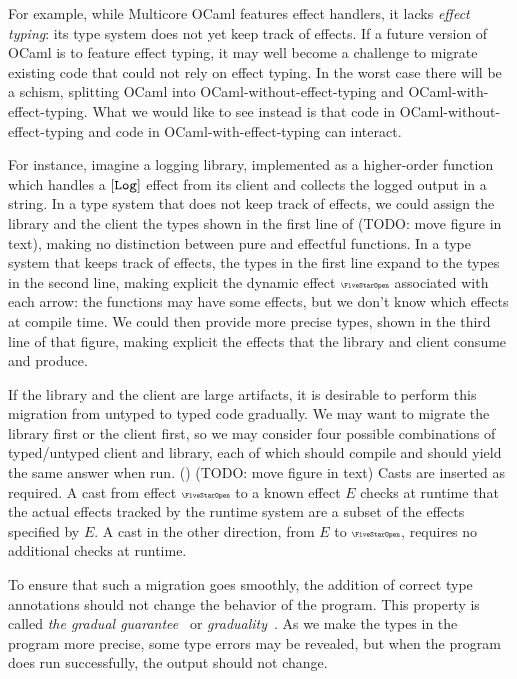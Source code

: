 For example,
while Multicore OCaml features effect handlers, it lacks \emph{effect typing}:
its type system does not yet keep track of effects.
If a future version of OCaml is to feature effect typing,
it may well become a challenge to migrate existing code that could
not rely on effect typing. In the worst case there will be a
schism, splitting OCaml into OCaml-without-effect-typing and
OCaml-with-effect-typing. What we would like to see instead
is that code in OCaml-without-effect-typing and
code in OCaml-with-effect-typing can interact.

For instance, imagine a logging library, implemented as a higher-order function
which handles a ${[\texttt{Log}]}$ effect from its client and collects the logged output
in a string. In a type system that does not keep track of effects, we could assign the
library and the client the types shown in the first line of
(TODO: move figure in text), making no distinction between pure and effectful
functions.
In a type system that keeps track of effects, the types in the first line
expand to the types in the second line, making explicit the dynamic effect $\effany$
associated with each arrow: the functions may have some effects, but we
don't know which effects at compile time.
We could then provide more precise types,
shown in the third line of that figure,
making explicit the effects that the library and client consume and produce.

If the library and the client are large artifacts, it is desirable to
perform this migration from untyped to typed code gradually.
We may want to migrate the library first or the client first, so we
may consider four possible combinations of typed/untyped client and library,
each of which should compile and should yield the same answer when run.
() (TODO: move figure in text)
Casts are inserted as required. A cast from effect $\effany$ to a known effect $E$
checks at runtime that the actual effects tracked by the runtime system are
a subset of the effects specified by $E$. A cast in the other direction,
from $E$ to $\effany$, requires no additional checks at runtime.

To ensure that such a migration goes smoothly, the addition of correct type annotations
should not change the behavior of the program. This property
is called \emph{the gradual guarantee}~\citep{siek2015} or \emph{graduality}~\citep{new-ahmed-2018}.
As we make the types in the program more precise, some type errors may be
revealed, but when the program does run successfully, the output
should not change.

